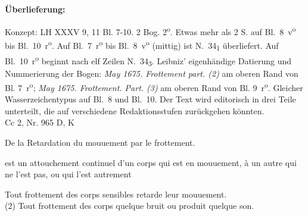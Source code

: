 \begin{ledgroupsized}[r]{120mm}
\footnotesize
\pstart
\noindent\textbf{\"{U}berlieferung:}
\pend
\end{ledgroupsized}
%
\begin{ledgroupsized}[r]{114mm}
\footnotesize
\pstart
\parindent -6mm
Konzept: LH XXXV 9, 11 Bl. 7-10. 2 Bog. 2\textsuperscript{o}. Etwas mehr als 2  S. auf Bl.~8~v\textsuperscript{o} bis Bl.~10~r\textsuperscript{o}.
Auf Bl.~7~r\textsuperscript{o} bis Bl.~8~v\textsuperscript{o} (mittig) ist N.~34\textsubscript{1} überliefert.
Auf Bl.~10~r\textsuperscript{o} beginnt nach elf Zeilen N.~34\textsubscript{3}.
Leibniz' eigenh\"{a}ndige Datierung und Nummerierung der Bogen:
\textit{May 1675. Frottement part. (2)} am oberen Rand von Bl. 7~r\textsuperscript{o};
\textit{May 1675. Frottement. Part. (3)} am oberen Rand von Bl. 9~r\textsuperscript{o}.
Gleicher Wasserzeichentypus auf Bl.~8 und Bl.~10.
Der Text wird editorisch in drei Teile unterteilt,
die auf verschiedene Redaktionsstufen zur\"{u}ckgehen k\"{o}nnten.%
\\Cc 2, Nr. 965 D, K
\pend
\end{ledgroupsized}
\vspace{8mm}
%
%
\count{}
\count{}
\pstart\noindent
[8~v\textsuperscript{o}]
\pend
\pstart
\centering
De la Retardation\protect{} du mouuement par le frottement.
\pend
\vspace*{0.5em}
\pstart
{}
\pend
\begin{Geometrico}
 est un attouchement continuel d'un corps qui est en mouuement, \`{a} un autre qui ne l'est pas, ou qui l'est autrement
\end{Geometrico}
\begin{Geometrico}
Tout frottement des corps sensibles retarde leur mouuement.\\
(2) Tout frottement des corps
quelque bruit ou produit quelque son\protect{}.
\end{Geometrico}
